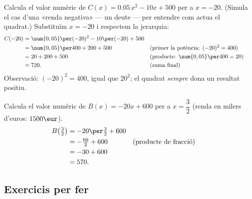 \begin{exresolt}
Calcula el valor numèric de $C(x) = \num{0,05}\,x^2 - 10x + 500$ per a $x = -20$.
(Simula el cas d'una «renda negativa» — un deute — per entendre com actua el quadrat.)
\solucio
Substituïm $x = -20$ i respectem la jerarquia:
\begin{align*}
C(-20) &= \num{0,05}\per(-20)^2 - 10\per(-20) + 500 \\
       &= \num{0,05}\per 400 + 200 + 500 &&\text{(primer la potència: $(-20)^2=400$)} \\
       &= 20 + 200 + 500                  &&\text{(producte: $\num{0,05}\per400=20$)} \\
       &= 720.                            &&\text{(suma final)}
\end{align*}
Observació: $(-20)^2 = 400$, igual que $20^2$; el quadrat \emph{sempre} dona
un resultat positiu.
\end{exresolt}

\begin{exresolt}
Calcula el valor numèric de $B(x) = -20x + 600$ per a $x = \dfrac{3}{2}$
(renda en milers d'euros: $1500\eur$).
\solucio
\begin{align*}
B\!\left(\tfrac{3}{2}\right) &= -20\per\tfrac{3}{2} + 600 \\
                             &= -\tfrac{60}{2} + 600 &&\text{(producte de fracció)} \\
                             &= -30 + 600 \\
                             &= 570.
\end{align*}
\end{exresolt}

\subsection{Exercicis per fer}

